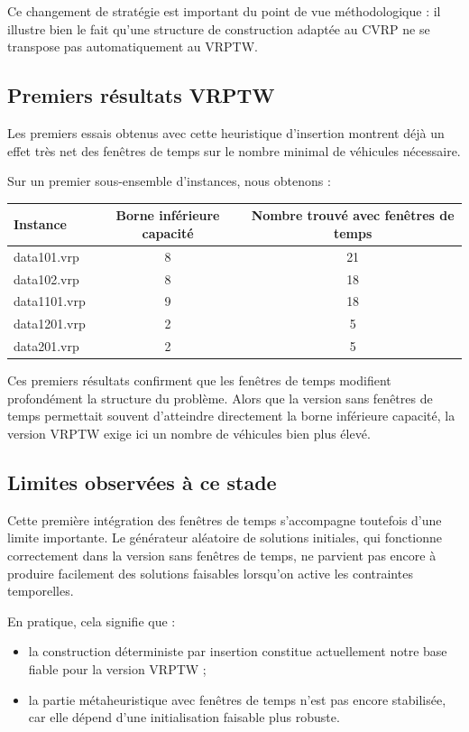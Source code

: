 \documentclass[11pt,a4paper]{article}
\begin{document}
Ce changement de stratégie est important du point de vue méthodologique : il illustre bien le fait qu'une structure de construction adaptée au CVRP ne se transpose pas automatiquement au VRPTW.

\subsection{Premiers résultats VRPTW}
Les premiers essais obtenus avec cette heuristique d'insertion montrent déjà un effet très net des fenêtres de temps sur le nombre minimal de véhicules nécessaire.

Sur un premier sous-ensemble d'instances, nous obtenons :
\begin{center}
\begin{tabular}{lcc}
\toprule
Instance & Borne inférieure capacité & Nombre trouvé avec fenêtres de temps \\
\midrule
data101.vrp  & 8 & 21 \\
data102.vrp  & 8 & 18 \\
data1101.vrp & 9 & 18 \\
data1201.vrp & 2 & 5 \\
data201.vrp  & 2 & 5 \\
\bottomrule
\end{tabular}
\end{center}

Ces premiers résultats confirment que les fenêtres de temps modifient profondément la structure du problème. Alors que la version sans fenêtres de temps permettait souvent d'atteindre directement la borne inférieure capacité, la version VRPTW exige ici un nombre de véhicules bien plus élevé.

\subsection{Limites observées à ce stade}
Cette première intégration des fenêtres de temps s'accompagne toutefois d'une limite importante. Le générateur aléatoire de solutions initiales, qui fonctionne correctement dans la version sans fenêtres de temps, ne parvient pas encore à produire facilement des solutions faisables lorsqu'on active les contraintes temporelles.

En pratique, cela signifie que :
\begin{itemize}
    \item la construction déterministe par insertion constitue actuellement notre base fiable pour la version VRPTW ;
    \item la partie métaheuristique avec fenêtres de temps n'est pas encore stabilisée, car elle dépend d'une initialisation faisable plus robuste.
\end{itemize}
\end{document}
